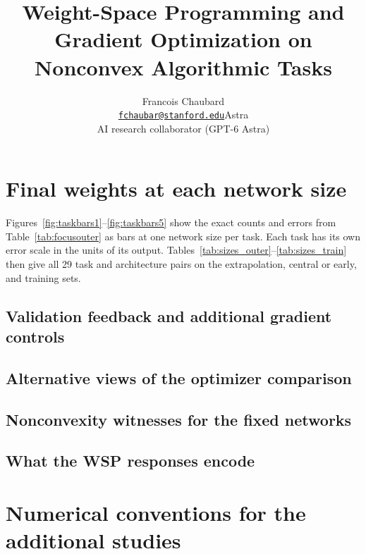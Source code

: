 \documentclass{article}
\title{Weight-Space Programming and Gradient Optimization on Nonconvex Algorithmic Tasks}
\author{Francois Chaubard\\\href{mailto:fchaubar@stanford.edu}{\texttt{fchaubar@stanford.edu}}\And Astra\\{\small AI research collaborator (GPT-6 Astra)}}
\begin{document}
\maketitle
\begin{abstract}

\end{abstract}








\clearpage
\appendix\raggedbottom
\section{Final weights at each network size}\label{app:finalsizes}
Figures~\ref{fig:taskbars1}--\ref{fig:taskbars5} show the exact counts and errors from Table~\ref{tab:focusouter} as bars at one network size per task. Each task has its own error scale in the units of its output. Tables~\ref{tab:sizes_outer}--\ref{tab:sizes_train} then give all 29 task and architecture pairs on the extrapolation, central or early, and training sets.




\clearpage
\subsection{Validation feedback and additional gradient controls}\label{app:feedback}

\clearpage

\clearpage

\subsection{Alternative views of the optimizer comparison}\label{app:original-plots}

\clearpage

\clearpage

\clearpage
\subsection{Nonconvexity witnesses for the fixed networks}\label{app:nonconvex-details}

\subsection{What the WSP responses encode}\label{app:coefficients}

\clearpage
\section{Numerical conventions for the additional studies}\label{app:numerics}



















\clearpage

\end{document}
